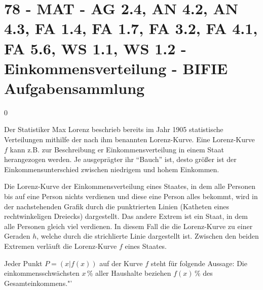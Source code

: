 \section{78 - MAT - AG 2.4, AN 4.2, AN 4.3, FA 1.4, FA 1.7, FA 3.2, FA 4.1, FA 5.6, WS 1.1, WS 1.2 - Einkommensverteilung - BIFIE Aufgabensammlung}

\begin{langesbeispiel} \item[0] %
	
Der Statistiker Max Lorenz beschrieb bereits im Jahr 1905 statistische Verteilungen mithilfe der nach ihm benannten Lorenz-Kurve. Eine Lorenz-Kurve $f$ kann z.B. zur Beschreibung er Einkommensverteilung in einem Staat herangezogen werden. Je ausgeprägter ihr "`Bauch"' ist, desto größer ist der Einkommensunterschied zwischen niedrigem und hohem Einkommen.

Die Lorenz-Kurve der Einkommensverteilung eines Staates, in dem alle Personen bis auf eine Person nichts verdienen und diese eine Person alles bekommt, wird in der nachstehenden Grafik durch die punktrierten Linien (Katheten eines rechtwinkeligen Dreiecks) dargestellt. Das andere Extrem ist ein Staat, in dem alle Personen gleich viel verdienen. In diesem Fall die die Lorenz-Kurve zu einer Geraden $h$, welche durch die strichlierte Linie dargestellt ist. Zwischen den beiden Extremen verläuft die Lorenz-Kurve $f$ eines Staates.\leer

Jeder Punkt $P=(x|f(x))$ auf der Kurve $f$ steht für folgende Aussage: Die einkommensschwächsten $x$\,\% aller Haushalte beziehen $f(x)$\,\% des Gesamteinkommens."'

\begin{center}
\end{center}


\end{langesbeispiel}
